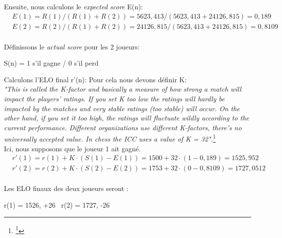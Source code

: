    Ensuite, nous calculons le \textit{expected score} E(n):
    \begin{equation}
        \begin{split}
            & E(1) = R(1) / ( R(1) + R(2)) = 5623,413 / (5623,413 + 24126,815) = 0,189 \\
            & E(2) = R(2) / ( R(1) + R(2)) = 24126,815 / (5623,413 + 24126,815) = 0,8109 \\
        \end{split}
    \end{equation}

    Définissons le \textit{actual score} pour les 2 joueurs:
    \begin{center}
        S(n) = 1 s'il gagne / 0 s'il perd
    \end{center}

    Calculons l'ELO final r'(n):
    Pour cela nous devons définir K: \\
    \textit{"This is called the K-factor and basically a measure of how strong a match will impact the players’ ratings.
    If you set K too low the ratings will hardly be impacted by the matches and very stable ratings (too stable) will occur.
    On the other hand, if you set it too high, the ratings will fluctuate wildly according to the current performance.
     Different organizations use different K-factors, there’s no universally accepted value. In chess the ICC uses a value of K = 32".}\footnote{\footnote{\href{https://metinmediamath.wordpress.com/2013/11/27/how-to-calculate-the-elo-rating-including-example/}{Metin's Media and Math, How To Calculate the Elo-Rating }}} \\
    Ici, nous supposons que le joueur 1 ait gagné.
    \begin{equation}
        \begin{split}
           & r'(1) = r(1) + K \cdot (S(1) - E(1)) = 1500 + 32 \cdot (1 - 0,189) = 1525,952 \\
           & r'(2) = r(2) + K \cdot (S(2) - E(2)) = 1753 + 32 \cdot (0-0,8109) = 1727,0512 \\
        \end{split}
    \end{equation}

    Les ELO finaux des deux joueurs seront :
    \begin{center}
        r(1) = 1526, +26 \ r(2) = 1727, -26
    \end{center}

